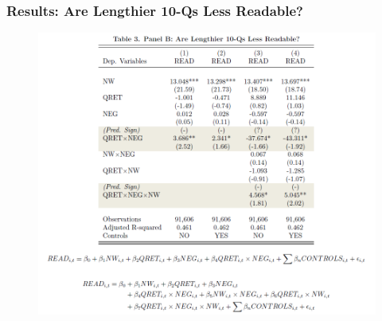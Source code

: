 \documentclass{beamer}
\begin{document}
\begin{frame}
\frametitle{Results: Are Lengthier 10-Qs Less Readable?}
\begin{figure}[h]
	\centering
	\includegraphics[width=0.9\linewidth]{tab3panB}
	\label{tab3panB}
\end{figure}
\end{frame}
\end{document}

